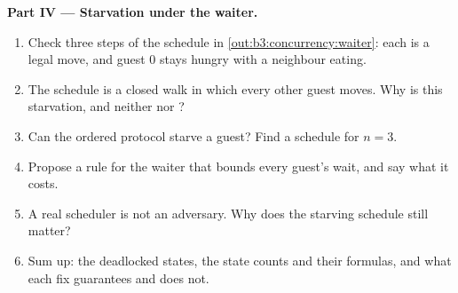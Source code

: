 \begin{problem}
\medskip\noindent\textbf{Part IV --- Starvation under the waiter.}
\begin{enumerate}[resume]
\item Check three steps of the schedule in \cref{out:b3:concurrency:waiter}: each is a legal move, and guest 0 stays hungry with a neighbour eating.
\item The schedule is a closed walk in which every other guest moves. Why is this starvation, and neither  nor ?
\item Can the ordered protocol starve a guest? Find a schedule for $n = 3$.
\item Propose a rule for the waiter that bounds every guest's wait, and say what it costs.
\item A real scheduler is not an adversary. Why does the starving schedule still matter?
\item Sum up: the deadlocked states, the state counts and their formulas, and what each fix guarantees and does not.
\end{enumerate}
\end{problem}

